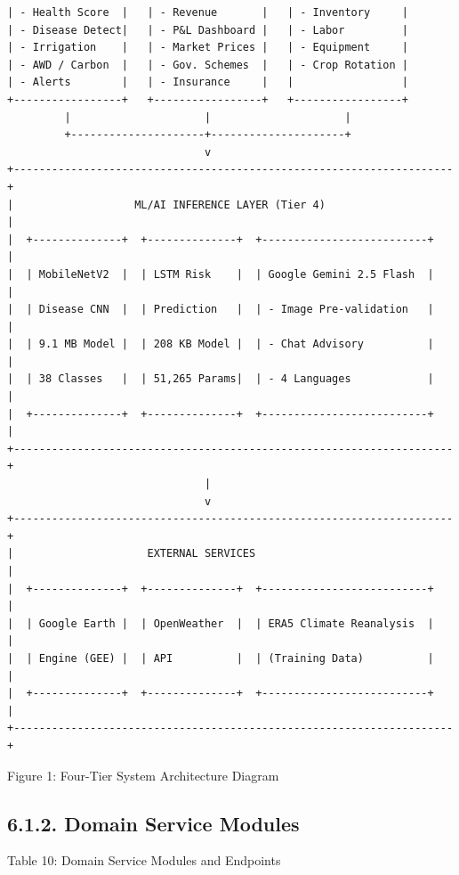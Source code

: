 \documentclass[12pt, a4paper]{report}
\begin{document}
\begin{Verbatim}[fontsize=\small]
| - Health Score  |   | - Revenue       |   | - Inventory     |
| - Disease Detect|   | - P&L Dashboard |   | - Labor         |
| - Irrigation    |   | - Market Prices |   | - Equipment     |
| - AWD / Carbon  |   | - Gov. Schemes  |   | - Crop Rotation |
| - Alerts        |   | - Insurance     |   |                 |
+-----------------+   +-----------------+   +-----------------+
         |                     |                     |
         +---------------------+---------------------+
                               v
+---------------------------------------------------------------------+
|                   ML/AI INFERENCE LAYER (Tier 4)                     |
|  +--------------+  +--------------+  +--------------------------+   |
|  | MobileNetV2  |  | LSTM Risk    |  | Google Gemini 2.5 Flash  |   |
|  | Disease CNN  |  | Prediction   |  | - Image Pre-validation   |   |
|  | 9.1 MB Model |  | 208 KB Model |  | - Chat Advisory          |   |
|  | 38 Classes   |  | 51,265 Params|  | - 4 Languages            |   |
|  +--------------+  +--------------+  +--------------------------+   |
+---------------------------------------------------------------------+
                               |
                               v
+---------------------------------------------------------------------+
|                     EXTERNAL SERVICES                                |
|  +--------------+  +--------------+  +--------------------------+   |
|  | Google Earth |  | OpenWeather  |  | ERA5 Climate Reanalysis  |   |
|  | Engine (GEE) |  | API          |  | (Training Data)          |   |
|  +--------------+  +--------------+  +--------------------------+   |
+---------------------------------------------------------------------+
\end{Verbatim}
Figure 1: Four-Tier System Architecture Diagram

\subsection{6.1.2. Domain Service Modules}
Table 10: Domain Service Modules and Endpoints
\end{document}

